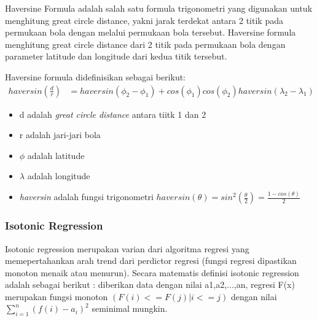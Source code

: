 \documentclass{article}
\begin{document}
\begin{adjustwidth}{4em}{0pt}
	
\hspace{\parindent}Haversine Formula adalah salah satu formula trigonometri yang digunakan untuk menghitung great circle distance, yakni jarak terdekat antara 2 titik pada permukaan bola dengan melalui permukaan bola tersebut. Haversine formula menghitung great circle distance dari 2 titik pada permukaan bola dengan parameter latitude dan longitude dari kedua titik tersebut.

Haversine formula didefinisikan sebagai berikut:
\begin{align*}
haversin(\frac{d}{r}) &= haversin(\phi _{2} - \phi _{1}) + cos(\phi _{1})cos(\phi _{2})haversin(\lambda _{2} - \lambda _{1})
\end{align*}
\begin{itemize}
	\setlength{\itemindent}{1cm}
	\item{d adalah \textit{great circle distance} antara tiitk 1 dan 2}
	\item{r adalah jari-jari bola}
	\item{$\phi$ adalah latitude}
	\item{$\lambda$ adalah longitude}
	\item{\textit{haversin} adalah fungsi trigonometri $haversin(\theta) = sin^2(\frac{\theta}{2}) = \frac{1-cos(\theta)}{2}$}
\end{itemize}

\end{adjustwidth}

\subsubsection{Isotonic Regression}
\begin{adjustwidth}{4em}{0pt}
	
\hspace{\parindent}Isotonic regression merupakan varian dari algoritma regresi yang memepertahankan arah trend dari perdictor regresi (fungsi regresi dipastikan monoton menaik atau menurun). Secara matematis definisi isotonic regression adalah sebagai berikut : diberikan data dengan nilai a1,a2,...,an, regresi F(x) merupakan fungsi monoton $(F(i) <= F(j) | i <= j)$  dengan nilai $\sum\limits_{i=1}^n({f(i)-a_{i}})^2$ seminimal mungkin.

\end{adjustwidth}
\end{document}
